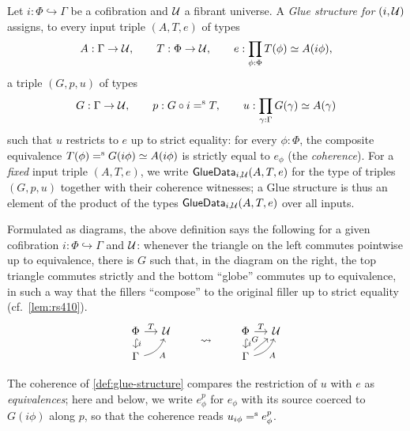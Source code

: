 \begin{definition}\label{def:glue-structure}
	Let \(i:\Phi \hookrightarrow \Gamma\) be a cofibration and $\mathcal{U}$ a
	fibrant universe. A \emph{Glue structure for $(i,\mathcal{U})$} assigns, to every
	input triple $(A, T, e)$ of types
	\[
	A:\Gamma\to\mathcal{U},
	\qquad
	T:\Phi\to\mathcal{U},
	\qquad
	e:\prod_{\phi:\Phi} T(\phi)\simeq A(i\phi),
	\]
	a triple $(G, p, u)$ of types
	\[
	G:\Gamma\to\mathcal{U},
	\qquad
	p:G\circ i\mathrel{=^\textup{s}} T,
	\qquad
	u:\prod_{\gamma:\Gamma} G(\gamma)\simeq A(\gamma)
	\]
	such that $u$ restricts to $e$ up to strict equality: for every
	$\phi:\Phi$, the composite equivalence
	$T(\phi) \mathrel{=^\textup{s}} G(i\phi) \simeq A(i\phi)$ is strictly equal to $e_\phi$
	(the \emph{coherence}).
	For a \emph{fixed} input triple $(A,T,e)$, we write
	$\mathsf{GlueData}_{i,\mathcal{U}}(A,T,e)$ for the type of triples $(G,p,u)$
	together with their coherence witnesses; a Glue structure is thus an
	element of the product of the types $\mathsf{GlueData}_{i,\mathcal{U}}(A,T,e)$
	over all inputs.
\end{definition}


Formulated as diagrams, the above definition says the following for a given cofibration \(i:\Phi \hookrightarrow \Gamma\) and $\mathcal{U}$:
whenever the triangle on the left commutes pointwise up to equivalence, there is $G$ such that, in the diagram on the right,
the top triangle commutes strictly and the bottom ``globe'' commutes up to equivalence,
in such a way that the fillers ``compose'' to the original filler up to strict equality (cf.~\cref{lem:rs410}).
\[
	\begin{tikzcd}[column sep=small, row sep=small]
		\Phi  \ar[r,"T"] \ar[d,hookrightarrow,"i"]
		& \UU  \\
		\Gamma \ar[ur,"A"',bend right] & 
	\end{tikzcd}
	\qquad\rightsquigarrow\qquad
	\begin{tikzcd}[column sep=small, row sep=small]
		\Phi  \ar[r,"T"] \ar[d,hookrightarrow,"i"]
		& \UU  \\
		\Gamma \ar[ur,"A"',bend right] \ar[ur,"G"]& 
	\end{tikzcd}
\]



The coherence of \cref{def:glue-structure} compares the
restriction of $u$ with $e$ as \emph{equivalences}; here and below, we write
$e^{p}_\phi$ for $e_\phi$ with its source coerced to $G(i\phi)$ along $p$,
so that the coherence reads $u_{i\phi}\mathrel{=^\textup{s}} e^{p}_\phi$.

